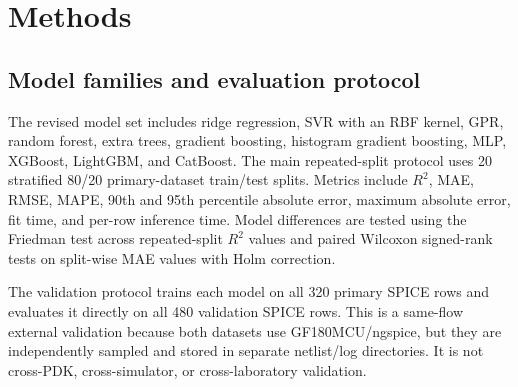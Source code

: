 \documentclass[preprint,12pt]{elsarticle}
\begin{document}
\begin{table}[H]
\centering
\caption{Datasets and variable ranges used in the revised study.}
\label{tab:datasets}
\end{table}

\section{Methods}

\subsection{Model families and evaluation protocol}

The revised model set includes ridge regression, SVR with an RBF kernel, GPR, random forest, extra trees, gradient boosting, histogram gradient boosting, MLP, XGBoost, LightGBM, and CatBoost. The main repeated-split protocol uses 20 stratified 80/20 primary-dataset train/test splits. Metrics include $R^2$, MAE, RMSE, MAPE, 90th and 95th percentile absolute error, maximum absolute error, fit time, and per-row inference time. Model differences are tested using the Friedman test across repeated-split $R^2$ values and paired Wilcoxon signed-rank tests on split-wise MAE values with Holm correction.

The validation protocol trains each model on all 320 primary SPICE rows and evaluates it directly on all 480 validation SPICE rows. This is a same-flow external validation because both datasets use GF180MCU/ngspice, but they are independently sampled and stored in separate netlist/log directories. It is not cross-PDK, cross-simulator, or cross-laboratory validation.
\end{document}
